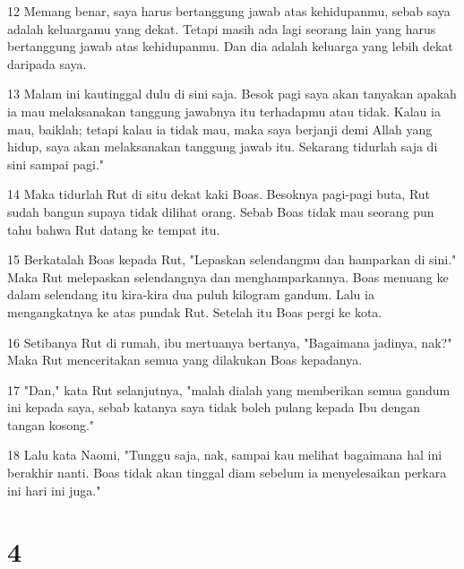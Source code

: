 \par 12 Memang benar, saya harus bertanggung jawab atas kehidupanmu, sebab saya adalah keluargamu yang dekat. Tetapi masih ada lagi seorang lain yang harus bertanggung jawab atas kehidupanmu. Dan dia adalah keluarga yang lebih dekat daripada saya.
\par 13 Malam ini kautinggal dulu di sini saja. Besok pagi saya akan tanyakan apakah ia mau melaksanakan tanggung jawabnya itu terhadapmu atau tidak. Kalau ia mau, baiklah; tetapi kalau ia tidak mau, maka saya berjanji demi Allah yang hidup, saya akan melaksanakan tanggung jawab itu. Sekarang tidurlah saja di sini sampai pagi."
\par 14 Maka tidurlah Rut di situ dekat kaki Boas. Besoknya pagi-pagi buta, Rut sudah bangun supaya tidak dilihat orang. Sebab Boas tidak mau seorang pun tahu bahwa Rut datang ke tempat itu.
\par 15 Berkatalah Boas kepada Rut, "Lepaskan selendangmu dan hamparkan di sini." Maka Rut melepaskan selendangnya dan menghamparkannya. Boas menuang ke dalam selendang itu kira-kira dua puluh kilogram gandum. Lalu ia mengangkatnya ke atas pundak Rut. Setelah itu Boas pergi ke kota.
\par 16 Setibanya Rut di rumah, ibu mertuanya bertanya, "Bagaimana jadinya, nak?" Maka Rut menceritakan semua yang dilakukan Boas kepadanya.
\par 17 "Dan," kata Rut selanjutnya, "malah dialah yang memberikan semua gandum ini kepada saya, sebab katanya saya tidak boleh pulang kepada Ibu dengan tangan kosong."
\par 18 Lalu kata Naomi, "Tunggu saja, nak, sampai kau melihat bagaimana hal ini berakhir nanti. Boas tidak akan tinggal diam sebelum ia menyelesaikan perkara ini hari ini juga."

\chapter{4}

